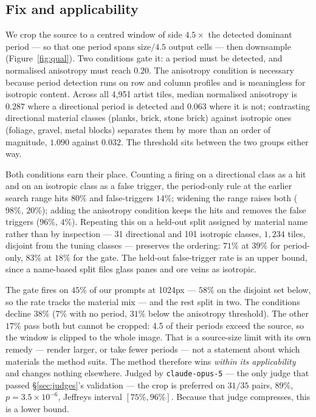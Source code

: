 \documentclass{article}
\begin{document}
\subsection{Fix and applicability}

We crop the source to a centred window of side $4.5\times$ the detected
dominant period --- so that one period spans $\text{size}/4.5$ output cells
--- then downsample (Figure~\ref{fig:qual}). Two conditions gate it:
a period must be detected, and normalised anisotropy must reach $0.20$.
The anisotropy condition is necessary because period detection runs on row and
column profiles and is meaningless for isotropic content. Across all 4{,}951
artist tiles, median normalised anisotropy is $0.287$ where a directional
period is detected and $0.063$ where it is not; contrasting directional
material classes (planks, brick, stone brick) against isotropic ones (foliage,
gravel, metal blocks) separates them by more than an order of magnitude,
$1.090$ against $0.032$. The threshold sits between the two groups either way.

Both conditions earn their place. Counting a firing on a directional class as
a hit and on an isotropic class as a false trigger, the period-only rule at
the earlier search range hits $80\%$ and false-triggers $14\%$; widening the
range raises both ($98\%$, $20\%$); adding the anisotropy condition keeps the
hits and removes the false triggers ($96\%$, $4\%$). Repeating this on a
held-out split assigned by material name rather than by inspection --- 31
directional and 101 isotropic classes, $1{,}234$ tiles, disjoint from the
tuning classes --- preserves the ordering: $71\%$ at $39\%$ for period-only,
$83\%$ at $18\%$ for the gate. The held-out false-trigger rate is an upper
bound, since a name-based split files glass panes and ore veins as isotropic.

The gate fires on $45\%$ of our prompts at 1024px --- $58\%$ on the
disjoint set below, so the rate tracks the material mix --- and the rest
split in two. The
conditions decline $38\%$ ($7\%$ with no period, $31\%$ below the anisotropy
threshold). The other $17\%$ pass both but cannot be cropped: 4.5 of their
periods exceed the source, so the window is clipped to the whole image. That
is a source-size limit with its own remedy --- render larger, or take fewer
periods --- not a statement about which materials the method suits. The
method therefore wins \emph{within its applicability} and changes nothing
elsewhere. Judged by
\texttt{claude-opus-5} --- the only judge that passed \S\ref{sec:judges}'s
validation --- the crop is preferred on $31/35$ pairs, $89\%$,
$p{=}3.5\times10^{-6}$, Jeffreys interval $[75\%, 96\%]$. Because that judge
compresses, this is a lower bound.
\end{document}
